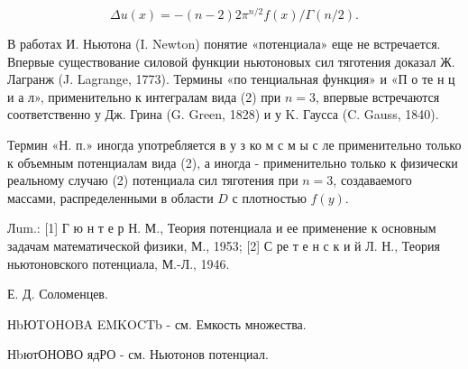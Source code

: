 \documentclass[10pt]{article}
\begin{document}
\[

\Delta u(x)=-(n-2) 2 \pi^{n / 2} f(x) / \Gamma(n / 2) .

\]



В работах И. Ньютона (I. Newton) понятие «потенциала» еще не встречается. Впервые существование силовой функции ньютоновых сил тяготения доказал Ж. Лагранж (J. Lagrange, 1773). Термины «по тенциальная функция» и «П о те н ц и а л», применительно к интегралам вида (2) при $n=3$, впервые встречаются соответственно у Дж. Грина (G. Green, 1828) и у K. Гаусса (C. Gauss, 1840).



Термин «Н. п.» иногда употребляется в у з ко м с м ы с ле применительно только к объемным потенциалам вида (2), а иногда - применительно только к физически реальному случаю (2) потенциала сил тяготения при $n=3$, создаваемого массами, распределенными в области $D$ с плотностью $f(y)$.



Лum.: [1] Г ю н т е р Н. М., Теория потенциала и ее применение к основным задачам математической физики, М., 1953; [2] С ре т е н с к и й Л. Н., Теория ньютоновского потенциала, М.-Л., 1946.



Е. Д. Соломенцев.



НbЮTOHOBA EMKOCTb - см. Емкость множества.



НbютОНОВО ядРО - см. Ньютонов потенциал.
\end{document}
